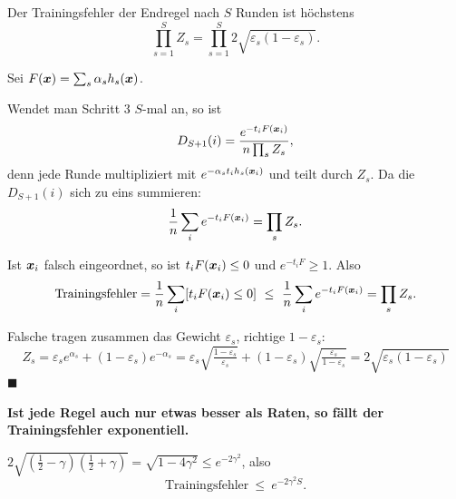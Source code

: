 \begin{merksatz}
Der Trainingsfehler der Endregel nach $S$ Runden ist höchstens
\[ \prod_{s=1}^{S} Z_s = \prod_{s=1}^{S} 2\sqrt{\varepsilon_s(1-\varepsilon_s)} . \]

Sei $F(\boldsymbol{x}) = \sum_s \alpha_s h_s(\boldsymbol{x})$.

 Wendet man Schritt 3 $S$-mal an, so ist
\[ D_{S+1}(i) = \frac{e^{-t_i F(\boldsymbol{x}_i)}}{n\prod_s Z_s} , \]
denn jede Runde multipliziert mit $e^{-\alpha_s t_i h_s(\boldsymbol{x}_i)}$ und teilt durch $Z_s$. Da die $D_{S+1}(i)$ sich zu eins summieren:
\[ \frac1n\sum_i e^{-t_iF(\boldsymbol{x}_i)} = \prod_s Z_s . \]

 Ist $\boldsymbol{x}_i$ falsch eingeordnet, so ist $t_iF(\boldsymbol{x}_i) \le 0$ und $e^{-t_iF} \ge 1$. Also
\[ \text{Trainingsfehler} = \frac1n\sum_i[t_iF(\boldsymbol{x}_i) \le 0] \ \le\ \frac1n\sum_i e^{-t_iF(\boldsymbol{x}_i)} = \prod_s Z_s . \]

 Falsche tragen zusammen das Gewicht $\varepsilon_s$, richtige $1-\varepsilon_s$:
\[ Z_s = \varepsilon_s e^{\alpha_s} + (1-\varepsilon_s)e^{-\alpha_s} = \varepsilon_s\sqrt{\tfrac{1-\varepsilon_s}{\varepsilon_s}} + (1-\varepsilon_s)\sqrt{\tfrac{\varepsilon_s}{1-\varepsilon_s}} = 2\sqrt{\varepsilon_s(1-\varepsilon_s)} \]
$\blacksquare$

\begin{center}
\begin{minipage}{0.9\textwidth}
\textbf{Ist jede Regel auch nur etwas besser als Raten, so fällt der Trainingsfehler exponentiell.}
\end{minipage}
\end{center}

 $2\sqrt{(\tfrac12-\gamma)(\tfrac12+\gamma)} = \sqrt{1-4\gamma^{2}} \le e^{-2\gamma^{2}}$, also
\[ \text{Trainingsfehler} \ \le\ e^{-2\gamma^{2}S} . \]

\begin{center}
\begin{minipage}{0.88\textwidth}
\end{minipage}
\end{center}
\end{merksatz}


